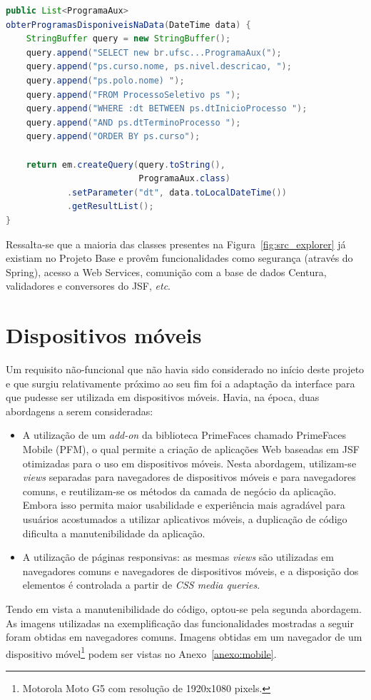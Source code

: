 \documentclass[
  10.5pt,				  %
	openright,			%
	twoside,			  %
  a5paper,
  chapter=TITLE,	%
	section=TITLE,	%
  hyphens,        %
	english,        %
	brazil          %
]{abntex2}
\begin{document}
\begin{lstlisting}[language=java, caption={Obtenção da lista de programas disponíveis.}, label={alg:programas_disponiveis}]
public List<ProgramaAux>
obterProgramasDisponiveisNaData(DateTime data) {
    StringBuffer query = new StringBuffer();
    query.append("SELECT new br.ufsc...ProgramaAux(");
    query.append("ps.curso.nome, ps.nivel.descricao, ");
    query.append("ps.polo.nome) ");
    query.append("FROM ProcessoSeletivo ps ");
    query.append("WHERE :dt BETWEEN ps.dtInicioProcesso ");
    query.append("AND ps.dtTerminoProcesso ");
    query.append("ORDER BY ps.curso");

    return em.createQuery(query.toString(),
                          ProgramaAux.class)
            .setParameter("dt", data.toLocalDateTime())
            .getResultList();
}
\end{lstlisting}
%


Ressalta-se que a maioria das classes presentes na Figura~\ref{fig:src_explorer} já existiam no Projeto Base e provêm funcionalidades como segurança (através do Spring), acesso a Web Services, comunição com a base de dados Centura, validadores e conversores do JSF, \emph{etc}.


\section{Dispositivos móveis}\label{sec:mobile}
Um requisito não-funcional que não havia sido considerado no início deste projeto e que surgiu relativamente próximo ao seu fim foi a adaptação da interface para que pudesse ser utilizada em dispositivos móveis. Havia, na época, duas abordagens a serem consideradas:

\begin{itemize}
  \item A utilização de um \emph{add-on} da biblioteca PrimeFaces chamado PrimeFaces Mobile (PFM), o qual permite a criação de aplicações Web baseadas em JSF otimizadas para o uso em dispositivos móveis. Nesta abordagem, utilizam-se \emph{views} separadas para navegadores de dispositivos móveis e para navegadores comuns, e reutilizam-se os métodos da camada de negócio da aplicação. Embora isso permita maior usabilidade e experiência mais agradável para usuários acostumados a utilizar aplicativos móveis, a duplicação de código dificulta a manutenibilidade da aplicação.
  \item A utilização de páginas responsivas: as mesmas \emph{views} são utilizadas em navegadores comuns e navegadores de dispositivos móveis, e a disposição dos elementos é controlada a partir de \emph{CSS media queries}.
\end{itemize}
%
Tendo em vista a manutenibilidade do código, optou-se pela segunda abordagem. As imagens utilizadas na exemplificação das funcionalidades mostradas a seguir foram obtidas em navegadores comuns. Imagens obtidas em um navegador de um dispositivo móvel\footnote{Motorola Moto G5 com resolução de 1920x1080 pixels.} podem ser vistas no Anexo~\ref{anexo:mobile}.
\end{document}
